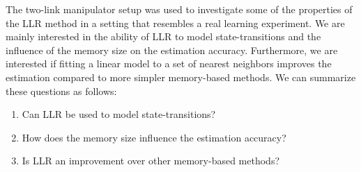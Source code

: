 The two-link manipulator setup was used to investigate some of the properties of the \ac{LLR} method in a setting that resembles a real learning experiment. We are mainly interested in the ability of \ac{LLR} to model state-transitions and the influence of the memory size on the estimation accuracy. Furthermore, we are interested if fitting a linear model to a set of nearest neighbors improves the estimation compared to more simpler memory-based methods. We can summarize these questions as follows:
\begin{enumerate}
	\item Can \ac{LLR} be used to model state-transitions?
	\item How does the memory size influence the estimation accuracy?
	\item Is \ac{LLR} an improvement over other memory-based methods?
\end{enumerate}



